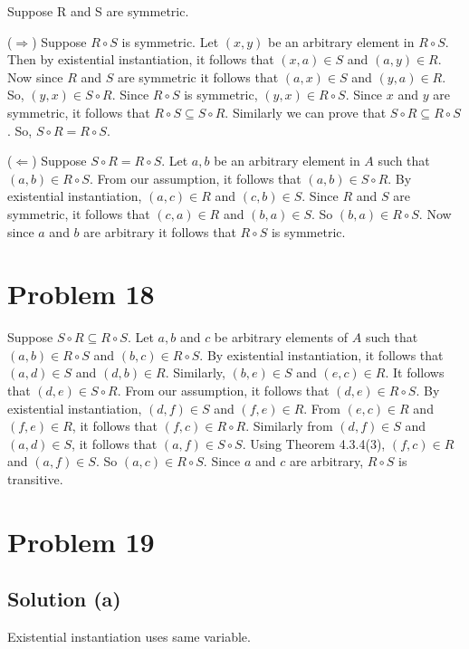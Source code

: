\documentclass{article}
\begin{document}
Suppose R and S are symmetric.

($\Rightarrow$) Suppose $R \circ S$ is symmetric. Let $(x,y)$ be an
arbitrary element in $R \circ S$. Then by existential instantiation,
it follows that $(x,a) \in S$ and $(a,y) \in R$. Now since $R$ and $S$
are symmetric it follows that $(a,x) \in S$ and $(y,a) \in R$. So,
$(y,x) \in S \circ R$. Since $R \circ S$ is symmetric,
$(y,x) \in R \circ S$. Since $x$ and $y$ are symmetric, it follows
that $R \circ S \subseteq S \circ R$. Similarly we can prove that $S
\circ R \subseteq R \circ S$. So, $S \circ R = R \circ S$.

($\Leftarrow$) Suppose $S \circ R = R \circ S$. Let $a,b$ be an
arbitrary element in $A$ such that $(a,b) \in R \circ S$. From our
assumption, it follows that $(a,b) \in S \circ R$. By existential
instantiation, $(a,c) \in R$ and $(c,b) \in S$. Since $R$ and $S$ are
symmetric, it follows that $(c,a) \in R$ and $(b,a) \in S$. So
$(b,a) \in R \circ S$. Now since $a$ and $b$ are arbitrary it follows
that $R \circ S$ is symmetric.

\section{Problem 18}

Suppose $S \circ R \subseteq R \circ S$. Let $a,b$ and $c$ be
arbitrary elements of $A$ such that $(a,b) \in R \circ S$ and
$(b,c) \in R \circ S$. By existential instantiation, it follows that
$(a,d) \in S$ and $(d,b) \in R$. Similarly, $(b,e) \in S$ and
$(e,c) \in R$. It follows that $(d,e) \in S \circ R$. From our
assumption, it follows that $(d,e) \in R \circ S$. By existential
instantiation, $(d,f) \in S$ and $(f,e) \in R$. From $(e,c) \in R$ and
$(f,e) \in R$, it follows that $(f,c) \in R \circ R$. Similarly from
$(d,f) \in S$ and $(a,d) \in S$, it follows that
$(a,f) \in S \circ S$. Using Theorem 4.3.4(3), $(f,c) \in R$ and
$(a,f) \in S$. So $(a,c) \in R \circ S$. Since $a$ and $c$ are
arbitrary, $R \circ S$ is transitive.

\section{Problem 19}

\subsection{Solution (a)}

Existential instantiation uses same variable.
\end{document}
